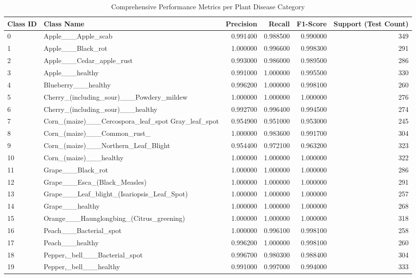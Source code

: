 \begin{table}
\caption{Comprehensive Performance Metrics per Plant Disease Category}
\label{tab:plant_metrics}
\begin{tabular}{llrrrr}
\toprule
Class ID & Class Name & Precision & Recall & F1-Score & Support (Test Count) \\
\midrule
0 & Apple___Apple_scab & 0.991400 & 0.988500 & 0.990000 & 349 \\
1 & Apple___Black_rot & 1.000000 & 0.996600 & 0.998300 & 291 \\
2 & Apple___Cedar_apple_rust & 0.993000 & 0.986000 & 0.989500 & 286 \\
3 & Apple___healthy & 0.991000 & 1.000000 & 0.995500 & 330 \\
4 & Blueberry___healthy & 0.996200 & 1.000000 & 0.998100 & 260 \\
5 & Cherry_(including_sour)___Powdery_mildew & 1.000000 & 1.000000 & 1.000000 & 276 \\
6 & Cherry_(including_sour)___healthy & 0.992700 & 0.996400 & 0.994500 & 274 \\
7 & Corn_(maize)___Cercospora_leaf_spot Gray_leaf_spot & 0.954900 & 0.951000 & 0.953000 & 245 \\
8 & Corn_(maize)___Common_rust_ & 1.000000 & 0.983600 & 0.991700 & 304 \\
9 & Corn_(maize)___Northern_Leaf_Blight & 0.954400 & 0.972100 & 0.963200 & 323 \\
10 & Corn_(maize)___healthy & 1.000000 & 1.000000 & 1.000000 & 322 \\
11 & Grape___Black_rot & 1.000000 & 1.000000 & 1.000000 & 286 \\
12 & Grape___Esca_(Black_Measles) & 1.000000 & 1.000000 & 1.000000 & 291 \\
13 & Grape___Leaf_blight_(Isariopsis_Leaf_Spot) & 1.000000 & 1.000000 & 1.000000 & 257 \\
14 & Grape___healthy & 1.000000 & 1.000000 & 1.000000 & 268 \\
15 & Orange___Haunglongbing_(Citrus_greening) & 1.000000 & 1.000000 & 1.000000 & 318 \\
16 & Peach___Bacterial_spot & 1.000000 & 0.996100 & 0.998100 & 258 \\
17 & Peach___healthy & 0.996200 & 1.000000 & 0.998100 & 260 \\
18 & Pepper,_bell___Bacterial_spot & 0.996700 & 0.980300 & 0.988400 & 304 \\
19 & Pepper,_bell___healthy & 0.991000 & 0.997000 & 0.994000 & 333 \\

\end{tabular}
\end{table}
